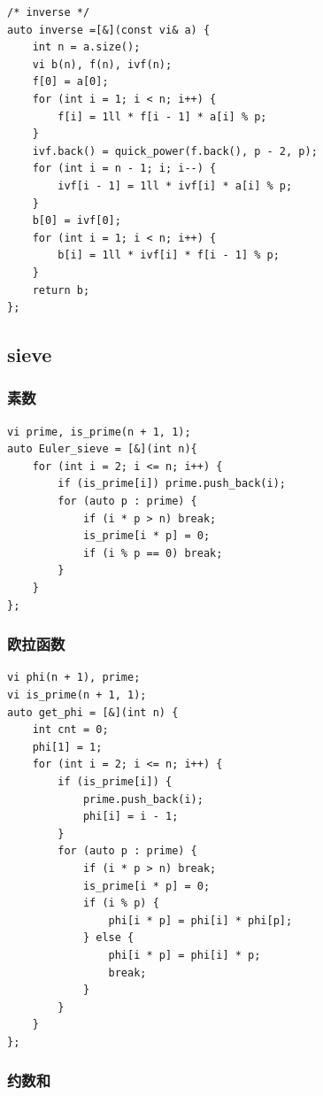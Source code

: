 \documentclass[UTF8, a4paper, titlepage, twoside]{ctexart}
\begin{document}
\begin{lstlisting}[style=cpp]
/* inverse */
auto inverse =[&](const vi& a) {
    int n = a.size();
    vi b(n), f(n), ivf(n);
    f[0] = a[0];
    for (int i = 1; i < n; i++) {
        f[i] = 1ll * f[i - 1] * a[i] % p;
    }
    ivf.back() = quick_power(f.back(), p - 2, p);
    for (int i = n - 1; i; i--) {
        ivf[i - 1] = 1ll * ivf[i] * a[i] % p;
    }
    b[0] = ivf[0];
    for (int i = 1; i < n; i++) {
        b[i] = 1ll * ivf[i] * f[i - 1] % p;
    }
    return b;
};
\end{lstlisting}

\subsection{ sieve }

\subsubsection*{ 素数 }
\begin{lstlisting}[style=cpp]
vi prime, is_prime(n + 1, 1);
auto Euler_sieve = [&](int n){
    for (int i = 2; i <= n; i++) {
        if (is_prime[i]) prime.push_back(i);
        for (auto p : prime) {
            if (i * p > n) break;
            is_prime[i * p] = 0;
            if (i % p == 0) break;
        }
    }
};
\end{lstlisting}

\subsubsection*{ 欧拉函数 }

\begin{lstlisting}[style=cpp]
vi phi(n + 1), prime;
vi is_prime(n + 1, 1);
auto get_phi = [&](int n) {
    int cnt = 0;
    phi[1] = 1;
    for (int i = 2; i <= n; i++) {
        if (is_prime[i]) {
            prime.push_back(i);
            phi[i] = i - 1;
        }
        for (auto p : prime) {
            if (i * p > n) break;
            is_prime[i * p] = 0;
            if (i % p) {
                phi[i * p] = phi[i] * phi[p];
            } else {
                phi[i * p] = phi[i] * p;
                break;
            }
        }
    }
};
\end{lstlisting}

\subsubsection*{ 约数和 }
\end{document}
